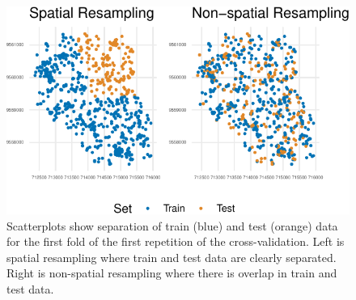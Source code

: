\begin{Shaded}
\begin{Highlighting}[]

\NormalTok{(} \NormalTok{, } \NormalTok{) }\SpecialCharTok{+}
  \NormalTok{(}\NormalTok{) }\SpecialCharTok{+}
   \NormalTok{, } \NormalTok{) }\SpecialCharTok{+}
  \NormalTok{(}\NormalTok{)) }\SpecialCharTok{+}
  \NormalTok{(} \NormalTok{) }\SpecialCharTok{\&}
  \NormalTok{() }\SpecialCharTok{\&}
  \NormalTok{(} \NormalTok{(} \NormalTok{), } \NormalTok{)}
\end{Highlighting}
\end{Shaded}

\begin{figure}[H]

{\centering \includegraphics[width=1\textwidth,height=\textheight]{chapters/chapter13/beyond_regression_and_classification_files/figure-pdf/fig-sprsmp-1.pdf}

}

\caption{\label{fig-sprsmp}Scatterplots show separation of train (blue)
and test (orange) data for the first fold of the first repetition of the
cross-validation. Left is spatial resampling where train and test data
are clearly separated. Right is non-spatial resampling where there is
overlap in train and test data.}

\end{figure}

